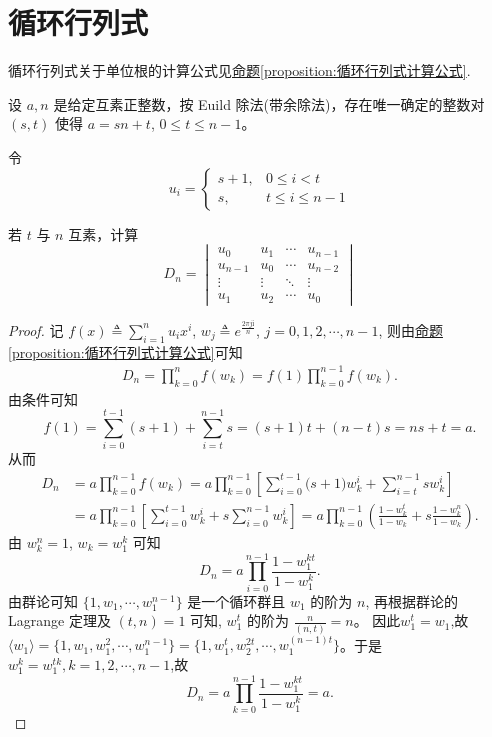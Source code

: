 \documentclass[../../main.tex]{subfiles}%
\begin{document}
\section{循环行列式}

循环行列式关于单位根的计算公式见\hyperref[proposition:循环行列式计算公式]{命题\ref{proposition:循环行列式计算公式}}.

\begin{example}
设 $a, n$ 是给定互素正整数，按 Euild 除法(带余除法)，存在唯一确定的整数对 $(s, t)$ 使得 $a = sn + t$, $0 \leqslant  t \leqslant  n - 1$。

令
\[u_i = 
\begin{cases} 
s + 1, & 0 \leqslant  i < t \\
s, & t \leqslant  i \leqslant  n - 1 
\end{cases}\]

若 $t$ 与 $n$ 互素，计算
\[D_n =
\begin{vmatrix}
u_0 & u_1 & \cdots & u_{n-1} \\
u_{n-1} & u_0 & \cdots & u_{n-2} \\
\vdots & \vdots & \ddots & \vdots \\
u_1 & u_2 & \cdots & u_0
\end{vmatrix}\]
\end{example}
\begin{proof}

记 $f(x) \triangleq \sum_{i=1}^n u_i x^i$, $w_j \triangleq e^{\frac{2\pi j \mathrm{i} }{n}}$, $j=0,1,2,\cdots,n-1$, 则由\hyperref[proposition:循环行列式计算公式]{命题\ref{proposition:循环行列式计算公式}}可知
\begin{align*}
D_n=\prod_{k=0}^n{f\left( w_k \right)}=f\left( 1 \right) \prod_{k=0}^{n-1}{f\left( w_k \right)}.
\end{align*}
由条件可知
\[
f(1) = \sum_{i=0}^{t-1} (s+1) + \sum_{i=t}^{n-1} s = (s+1)t + (n-t)s = ns + t = a.
\]
从而
\begin{align*}
D_n&=a\prod_{k=0}^{n-1}{f(w_k)}=a\prod_{k=0}^{n-1}{\left[ \sum_{i=0}^{t-1}{(s}+1)w_{k}^{i}+\sum_{i=t}^{n-1}{sw_{k}^{i}} \right]}
\\
&=a\prod_{k=0}^{n-1}{\left[ \sum_{i=0}^{t-1}{w_{k}^{i}}+s\sum_{i=0}^{n-1}{w_{k}^{i}} \right]}=a\prod_{k=0}^{n-1}{\left( \frac{1-w_{k}^{t}}{1-w_k}+s\frac{1-w_{k}^{n}}{1-w_k} \right)}.
\end{align*}
由 $w_{k}^{n} = 1$, $w_k = w_{1}^{k}$ 可知
\[
D_n = a \prod_{i=0}^{n-1} \frac{1-w_{1}^{kt}}{1-w_{1}^{k}}.
\]
由群论可知 $\{1, w_1, \cdots, w_{1}^{n-1}\}$ 是一个循环群且 $w_1$ 的阶为 $n$, 再根据群论的 Lagrange 定理及 $(t, n) = 1$ 可知, $w_{1}^{t}$ 的阶为 $\frac{n}{(n,t)} = n$。  
因此$w_1^t=w_1$,故$\langle w_1 \rangle=\{1,w_1, w_{1}^{2}, \cdots, w_{1}^{n-1}\} = \{1,w_{1}^{t}, w_{2}^{2t}, \cdots, w_{1}^{(n-1)t}\}$。于是 $w_{1}^{k} = w_{1}^{tk},k=1,2,\cdots,n-1$,故
\[
D_n = a \prod_{k=0}^{n-1} \frac{1-w_{1}^{kt}}{1-w_{1}^{k}} = a.
\]

\end{proof}
\end{document}
